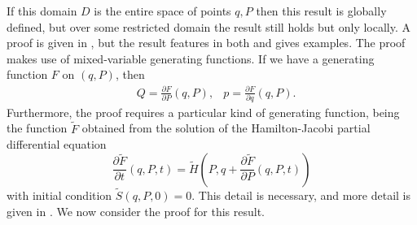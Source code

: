 If this domain $D$ is the entire space of points $q,P$ then this result is globally defined, but over some restricted domain the result still holds but only locally.
A proof is given in \cite{gni2006}, but the result features in both and \cite{Casas_2016} gives examples.
The proof makes use of mixed-variable generating functions. If we have a generating function $F$ on $(q,P)$,
then
\begin{align*}
	&Q = \frac{\partial F}{\partial P}(q,P), &p = \frac{\partial F}{\partial q}(q,P).
\end{align*}
Furthermore, the proof requires a particular kind of generating function, being the function $\tilde{F}$ obtained from the solution of the Hamilton-Jacobi partial differential equation
\begin{equation*}
	\frac{\partial \tilde{F}}{\partial t}(q,P,t) = \tilde{H} \left(
		P, q + \frac{\partial \tilde{F}}{\partial P}(q,P,t)
	\right)
\end{equation*}
with initial condition $\tilde{S}(q,P,0) = 0$.
This detail is necessary, and more detail is given in \cite{gni2006}.
We now consider the proof for this result.
